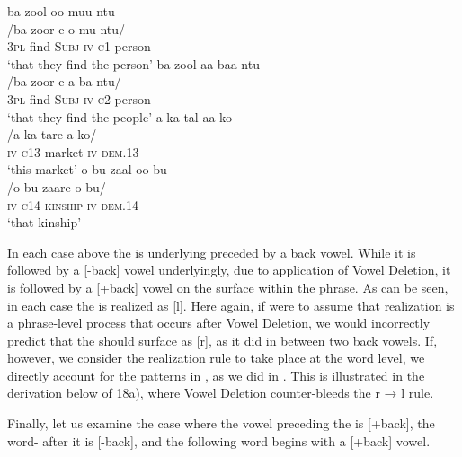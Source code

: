 \documentclass[output=paper,modfonts,nonflat,
 hidelinks
]{langsci/langscibook}
\begin{document}
\ea\label{ex:bickmore:18}
\ea\label{ex:bickmore:18a}
\glll  ba-zool oo-muu-ntu    \\
      /ba-zoor-e o-mu-ntu/	\\
\textsc{3pl-}\textup{find}\textsc{{}-Subj} \textsc{iv-c1-}\textup{person}\\
\glt      ‘that they find the person’
\ex\label{ex:bickmore:18b}
\glll  ba-zool aa-baa-ntu    \\
      /ba-zoor-e a-ba-ntu/	\\
\textsc{3pl-}\textup{find}\textsc{{}-Subj} \textsc{iv-c2-}\textup{person}\\
\glt      ‘that they find the people’
\ex\label{ex:bickmore:18c}
\glll  a-ka-tal aa-ko    \\
      /a-ka-tare a-ko/	\\
\textsc{iv-c13-}\textup{market} \textsc{iv-dem.13}\\
\glt      ‘this market’
\ex\label{ex:bickmore:18d}
\glll  o-bu-zaal oo-bu    \\
      /o-bu-zaare o-bu/	\\
\textsc{iv-c14-kinship} \textsc{iv-dem.14}\\
\glt      ‘that kinship’
\z
\z

In each case above the  is underlying preceded by a back vowel. While it is followed by a [-back] vowel underlyingly, due to application of Vowel Deletion, it is followed by a [+back] vowel on the surface within the phrase. As can be seen, in each case the  is realized as [l]. Here again, if were to assume that  realization is a phrase-level process that occurs after Vowel Deletion, we would incorrectly predict that the  should surface as [r], as it did in  between two back vowels. If, however, we consider the  realization rule to take place at the word level, we directly account for the patterns in , as we did in . This is illustrated in the derivation below of 18a), where Vowel Deletion counter-bleeds the r → l rule.

\ea\label{ex:bickmore:19}
\z

Finally, let us examine the case where the vowel preceding the  is [+back], the word- after it is [-back], and the following word begins with a [+back] vowel.
\end{document}
